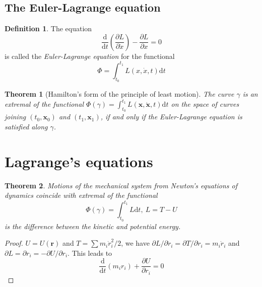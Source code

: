 \documentclass[conference]{IEEEtran}
\newtheorem{theorem}{Theorem}[section]
\theoremstyle{definition}
\newtheorem{definition}{Definition}[section]
\theoremstyle{remark}
\begin{document}
    \subsection{The Euler-Lagrange equation}
    \begin{definition}
        The equation
        \begin{equation*}
            \dfrac{\mathrm{d}}{\mathrm{d} t} \left( \dfrac{\partial L}{\partial \dot{x}} \right) - \dfrac{\partial L}{\partial x} = 0
        \end{equation*}
        is called the \emph{Euler-Lagrange equation} for the functional
        \begin{equation*}
            \Phi = \int_{t_0}^{t_1} L(x, \dot{x}, t) \mathrm{d}t
        \end{equation*}
    \end{definition}

    \begin{theorem}[Hamilton's form of the principle of least motion]
        The curve $\gamma$ is an extremal of the functional $\Phi(\gamma) = \int_{t_0}^{t_1} L(\mathbf{x}, \dot{\mathbf{x}}, t) \mathrm{d} t$ on the space of curves joining $(t_0, \mathbf{x}_0)$ and $(t_1, \mathbf{x}_1)$, if and only if the Euler-Lagrange equation is satisfied along $\gamma$.
    \end{theorem}

    \section{Lagrange's equations}
    \begin{theorem}
        Motions of the mechanical system from Newton's equations of dynamics coincide with extremal of the functional
        \begin{equation*}
            \Phi(\gamma) = \int_{t_0}^{t_1} L \mathrm{d} t,\ L = T - U
        \end{equation*}
        is the difference between the kinetic and potential energy.
    \end{theorem}

    \begin{proof}
        $U = U(\mathbf{r})$ and $T = \sum m_i \dot{r}_i^2/2$, we have $\partial L / \partial \dot{r}_i = \partial T / \partial \dot{r}_i = m_i \dot{r}_i$ and $\partial L = \partial r_i = -\partial U / \partial r_i$. This leads to
        \begin{equation*}
            \dfrac{\mathrm{d}}{\mathrm{d} t} (m_i r_i) + \dfrac{\partial U}{\partial r_i} = 0
        \end{equation*}
    \end{proof}
\end{document}
